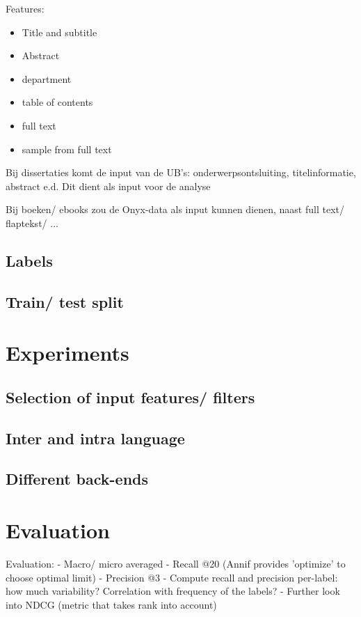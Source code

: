 \documentclass{article}
\begin{document}
Features:\begin{itemize}
\item Title and subtitle
\item Abstract
\item department
\item table of contents
\item full text
\item sample from full text
\end{itemize}


Bij dissertaties komt de input van de UB's: onderwerpsontsluiting, titelinformatie, abstract e.d.
Dit dient als input voor de analyse

Bij boeken/ ebooks zou de Onyx-data als input kunnen dienen, naast full text/ flaptekst/ ...


\subsection{Labels}

\subsection{Train/ test split}


\section{Experiments}

\subsection{Selection of input features/ filters}
\subsection{Inter and intra language}
\subsection{Different back-ends}


\section{Evaluation}

Evaluation:
   - Macro/ micro averaged
   - Recall @20 (Annif provides 'optimize' to choose optimal limit)
   - Precision @3
   - Compute recall and precision per-label: how much variability? Correlation with frequency of the labels?
   - Further look into NDCG (metric that takes rank into account)
\end{document}
